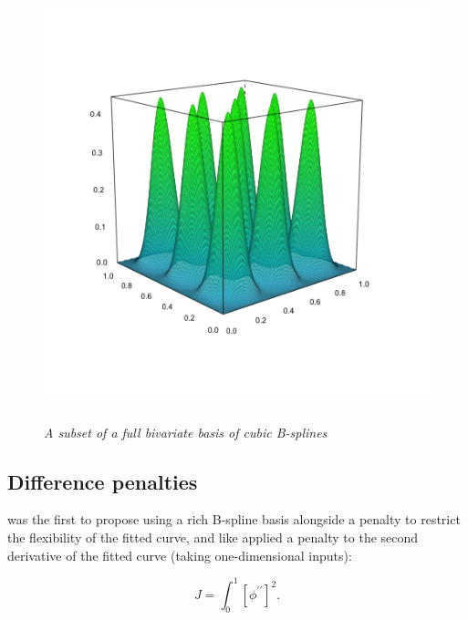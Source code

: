 \begin{figure}[H]
  \centering
  \graphicspath{{img/}}
  \includegraphics[width=5in,height=5in]{sparse_bicubic_basis.png}
  \caption{\textit{A subset of a full bivariate basis of cubic B-splines}}\label{fig:sparse_bicubic_BS_basis}
\end{figure}



\subsection{Difference penalties}

\cite{o1986statistical} was the first to propose using a rich B-spline basis alongside a penalty to restrict the flexibility of the fitted curve, and like \citet{wahba1990spline} applied a penalty to the second derivative of the fitted curve (taking one-dimensional inputs):

\begin{equation} \label{eq:second-derivative-penalty}
J = \int_0^1 \left[ \phi^{\prime \prime}\right]^2.
\end{equation}

